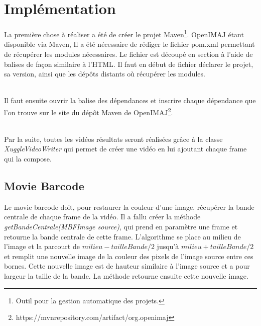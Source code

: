 \documentclass[10pt,a4paper]{article}
\begin{document}
\newpage
\section{Implémentation}

La première chose à réaliser a été de créer le projet Maven\footnote{Outil pour la gestion automatique des projets.}. OpenIMAJ étant disponible via Maven,
Il a été nécessaire de rédiger le fichier pom.xml permettant de récupérer les modules nécessaires. Le fichier est découpé en section à l'aide de balises de façon similaire à l'HTML. Il faut en début de fichier déclarer le projet, sa version, ainsi que les dépôts distants où récupérer les modules.



~~\\
Il faut ensuite ouvrir la balise des dépendances et inscrire chaque dépendance que l'on trouve sur le site du dépôt Maven de OpenIMAJ\footnote{https://mvnrepository.com/artifact/org.openimaj}.


~~\\

Par la suite, toutes les vidéos résultats seront réalisées grâce à la classe \textit{XuggleVideoWriter} qui permet de créer une vidéo en lui ajoutant chaque frame qui la compose.

\subsection{Movie Barcode}

Le movie barcode doit, pour restaurer la couleur d'une image, récupérer la bande centrale de chaque frame de la vidéo. Il a fallu créer la méthode \textit{getBandeCentrale(MBFImage source)}, qui prend en paramètre une frame et retourne la bande centrale de cette frame. L'algorithme se place au milieu de l'image et la parcourt de $milieu - tailleBande /2$ jusqu'à $milieu + tailleBande /2$ et remplit une nouvelle image de la couleur des pixels de l'image source entre ces bornes. Cette nouvelle image est de hauteur similaire à l'image source et a pour largeur la taille de  la bande. La méthode retourne ensuite cette nouvelle image.
\end{document}

